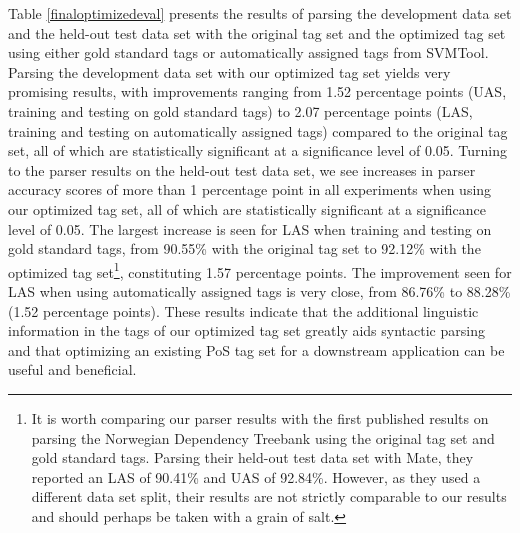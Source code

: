 \documentclass[a4paper,12pt,english]{book}
\begin{document}
Table \ref{finaloptimizedeval} presents the results of parsing the development
data set and the held-out test data set with the original tag set and the
optimized tag set using either gold standard tags or automatically assigned
tags from SVMTool. Parsing the development data set with our optimized tag set
yields very promising results, with improvements ranging from 1.52 percentage
points (UAS, training and testing on gold standard tags) to 2.07 percentage
points (LAS, training and testing on automatically assigned tags) compared to
the original tag set, all of which are statistically significant at a
significance level of 0.05. Turning to the parser results on the held-out test
data set, we see increases in parser accuracy scores of more than 1 percentage
point in all experiments when using our optimized tag set, all of which are
statistically significant at a significance level of 0.05. The largest increase
is seen for LAS when training and testing on gold standard tags, from 90.55\%
with the original tag set to 92.12\% with the optimized tag set\footnote{It is
    worth comparing our parser results with the first published results on
    parsing the Norwegian Dependency Treebank \cite{Sol:Skj:Ovr:14} using the
    original tag set and gold standard tags. Parsing their held-out test data
    set with Mate, they reported an LAS of 90.41\% and UAS of 92.84\%. However,
    as they used a different data set split, their results are not strictly
    comparable to our results and should perhaps be taken with a grain of
    salt.}, constituting 1.57 percentage points. The improvement seen for LAS
when using automatically assigned tags is very close, from 86.76\% to 88.28\%
(1.52 percentage points). These results indicate that the additional
linguistic information in the tags of our optimized tag set greatly aids
syntactic parsing and that optimizing an existing PoS tag set for a downstream
application can be useful and beneficial.


\end{document}
